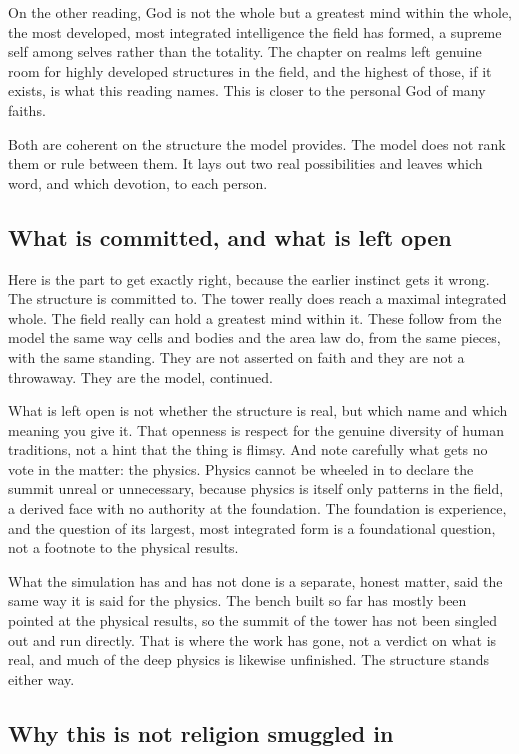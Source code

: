 On the other reading, God is not the whole but a greatest mind within the whole, the most developed, most integrated intelligence the field has formed, a supreme self among selves rather than the totality. The chapter on realms left genuine room for highly developed structures in the field, and the highest of those, if it exists, is what this reading names. This is closer to the personal God of many faiths.

Both are coherent on the structure the model provides. The model does not rank them or rule between them. It lays out two real possibilities and leaves which word, and which devotion, to each person.

\subsection{What is committed, and what is left open}

Here is the part to get exactly right, because the earlier instinct gets it wrong. The structure is committed to. The tower really does reach a maximal integrated whole. The field really can hold a greatest mind within it. These follow from the model the same way cells and bodies and the area law do, from the same pieces, with the same standing. They are not asserted on faith and they are not a throwaway. They are the model, continued.

What is left open is not whether the structure is real, but which name and which meaning you give it. That openness is respect for the genuine diversity of human traditions, not a hint that the thing is flimsy. And note carefully what gets no vote in the matter: the physics. Physics cannot be wheeled in to declare the summit unreal or unnecessary, because physics is itself only patterns in the field, a derived face with no authority at the foundation. The foundation is experience, and the question of its largest, most integrated form is a foundational question, not a footnote to the physical results.

What the simulation has and has not done is a separate, honest matter, said the same way it is said for the physics. The bench built so far has mostly been pointed at the physical results, so the summit of the tower has not been singled out and run directly. That is where the work has gone, not a verdict on what is real, and much of the deep physics is likewise unfinished. The structure stands either way.

\subsection{Why this is not religion smuggled in}

